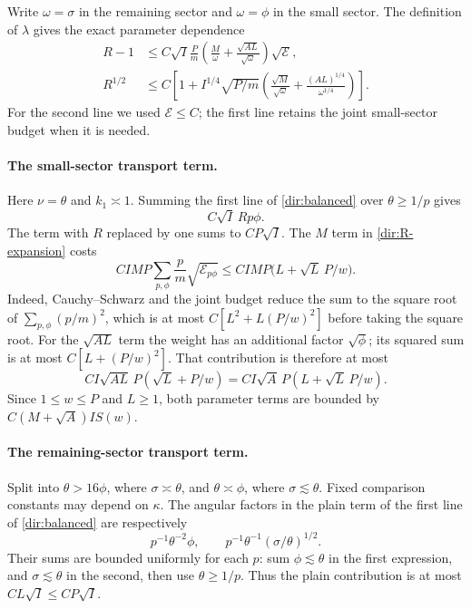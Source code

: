 Write $\omega=\sigma$ in the remaining sector and
$\omega=\phi$ in the small sector.  The definition of $\lambda$
gives the exact parameter dependence
\begin{equation}\label{dir:R-expansion}
 \begin{split}
 R-1
 &\le C\sqrt I\frac Pm
       \left(\frac M\omega+
                     \frac{\sqrt{AL}}{\sqrt\omega}\right)
       \sqrt{\mathcal E},\\
 R^{1/2}
 &\le C\left[1+I^{1/4}\sqrt{P/m}
       \left(\frac{\sqrt M}{\sqrt\omega}+
                     \frac{(AL)^{1/4}}{\omega^{1/4}}\right)
       \right].
 \end{split}
\end{equation}
For the second line we used $\mathcal E\le C$; the first line retains
the joint small-sector budget when it is needed.

\paragraph{The small-sector transport term.}
Here $\nu=\theta$ and $k_1\asymp1$.  Summing the first line of
\eqref{dir:balanced} over $\theta\ge1/p$ gives
\begin{equation}\label{dir:small-budget}
 C\sqrt I\,R p\phi.
\end{equation}
The term with $R$ replaced by one sums to $CP\sqrt I$.
The $M$ term in \eqref{dir:R-expansion} costs
\[
 CIM P\sum_{p,\phi}\frac p m\sqrt{\mathcal E_{p\phi}}
 \le CIM P\bigl(L+\sqrt L\,P/w\bigr).
\]
Indeed, Cauchy--Schwarz and the joint budget reduce the sum to the
square root of $\sum_{p,\phi}(p/m)^2$, which is at most
$C[L^2+L(P/w)^2]$ before taking the square root.  For the
$\sqrt{AL}$ term the weight has an additional factor $\sqrt\phi$;
its squared sum is at most $C[L+(P/w)^2]$.  That contribution is
therefore at most
\[
 CI\sqrt{AL}\,P(\sqrt L+P/w)
 =CI\sqrt A\,P(L+\sqrt L\,P/w).
\]
Since $1\le w\le P$ and $L\ge1$, both parameter terms are bounded
by $C(M+\sqrt A)I S(w)$.

\paragraph{The remaining-sector transport term.}
Split into $\theta>16\phi$, where $\sigma\asymp\theta$, and
$\theta\asymp\phi$, where $\sigma\lesssim\theta$.  Fixed comparison
constants may depend on $\kappa$.  The angular factors in the plain
term of the first line of \eqref{dir:balanced} are respectively
\[
 p^{-1}\theta^{-2}\phi,
 \qquad p^{-1}\theta^{-1}(\sigma/\theta)^{1/2}.
\]
Their sums are bounded uniformly for each $p$: sum $\phi\lesssim
\theta$ in the first expression, and $\sigma\lesssim\theta$ in the
second, then use $\theta\ge1/p$.  Thus the plain contribution is at
most $CL\sqrt I\le CP\sqrt I$.


